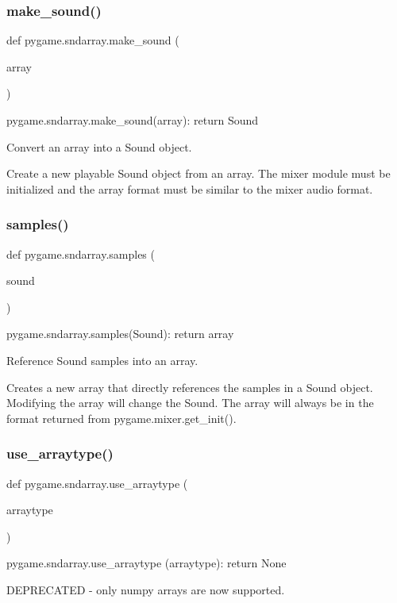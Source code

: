 \subsubsection{\texorpdfstring{make\+\_\+sound()}{make\_sound()}}
{\footnotesize\ttfamily def pygame.\+sndarray.\+make\+\_\+sound (\begin{DoxyParamCaption}\item[{}]{array }\end{DoxyParamCaption})}

\begin{DoxyVerb}pygame.sndarray.make_sound(array): return Sound

Convert an array into a Sound object.

Create a new playable Sound object from an array. The mixer module
must be initialized and the array format must be similar to the mixer
audio format.
\end{DoxyVerb}
 \mbox{\label{namespacepygame_1_1sndarray_a5e83514c733600fcd28b5272d08e3caf}} 
\subsubsection{\texorpdfstring{samples()}{samples()}}
{\footnotesize\ttfamily def pygame.\+sndarray.\+samples (\begin{DoxyParamCaption}\item[{}]{sound }\end{DoxyParamCaption})}

\begin{DoxyVerb}pygame.sndarray.samples(Sound): return array

Reference Sound samples into an array.

Creates a new array that directly references the samples in a Sound
object. Modifying the array will change the Sound. The array will
always be in the format returned from pygame.mixer.get_init().
\end{DoxyVerb}
 \mbox{\label{namespacepygame_1_1sndarray_aa4ea420eae3d540ff373d0903c2559e0}} 
\subsubsection{\texorpdfstring{use\+\_\+arraytype()}{use\_arraytype()}}
{\footnotesize\ttfamily def pygame.\+sndarray.\+use\+\_\+arraytype (\begin{DoxyParamCaption}\item[{}]{arraytype }\end{DoxyParamCaption})}

\begin{DoxyVerb}pygame.sndarray.use_arraytype (arraytype): return None

DEPRECATED - only numpy arrays are now supported.
\end{DoxyVerb}
 